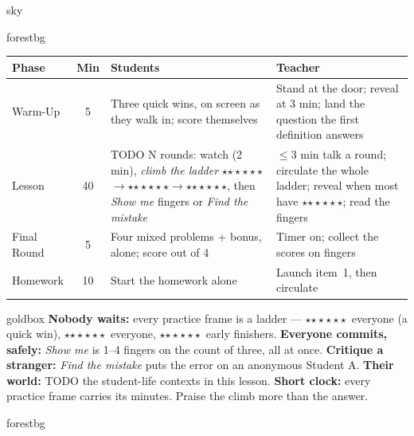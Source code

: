 \documentclass[10pt]{article}
\newcommand{\rung}[1]{{\color{goldacc}\ifcase#1\or$\star$\or$\star\star$\or$\star\star\star$\fi}}
\begin{document}
\begin{skillbox}{sky}
\end{skillbox}

\begin{fixedskillbox}{forestbg}
\renewcommand{\arraystretch}{1.25}
\begin{tabularx}{\linewidth}{@{}l c X X@{}}
\textbf{Phase} & \textbf{Min} & \textbf{Students} & \textbf{Teacher} \\
\hline
Warm-Up & 5 & Three quick wins, on screen as they walk in; score themselves & Stand at the door; reveal at 3 min; land the question the first definition answers \\
Lesson & 40 & TODO N rounds: watch (2 min), \emph{climb the ladder} \rung1$\to$\rung2$\to$\rung3, then \emph{Show me} fingers or \emph{Find the mistake} & $\le$3 min talk a round; circulate the whole ladder; reveal when most have \rung2; read the fingers \\
Final Round & 5 & Four mixed problems + bonus, alone; score out of 4 & Timer on; collect the scores on fingers \\
Homework & 10 & Start the homework alone & Launch item~1, then circulate \\
\end{tabularx}
\end{fixedskillbox}

\begin{skillbox}{goldbox}
\textbf{Nobody waits:} every practice frame is a ladder --- \rung1\ everyone (a quick win),
\rung2\ everyone, \rung3\ early finishers. \textbf{Everyone commits, safely:} \emph{Show me} is
1--4 fingers on the count of three, all at once. \textbf{Critique a stranger:} \emph{Find the
mistake} puts the error on an anonymous Student A. \textbf{Their world:} TODO the student-life
contexts in this lesson. \textbf{Short clock:} every practice frame carries its minutes. Praise
the climb more than the answer.
\end{skillbox}

\begin{skillbox}{forestbg}
\end{skillbox}
\end{document}
